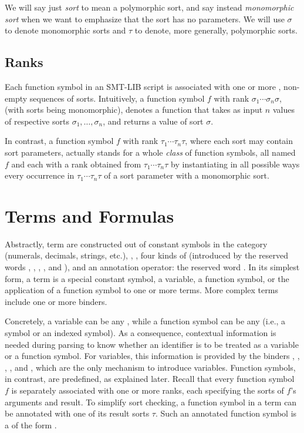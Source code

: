We will say just \emph{sort} to mean a polymorphic sort, and 
say instead \emph{monomorphic sort} when we want to emphasize 
that the sort has no parameters. 
We will use $\sigma$ to denote monomorphic sorts and 
$\tau$ to denote, more generally, polymorphic sorts.


\subsection{Ranks}

Each function symbol in an SMT-LIB script is associated with one or more 
, non-empty sequences of sorts.
Intuitively, a function symbol $f$ with rank $\sigma_1\cdots\sigma_n\sigma$,
(with sorts being monomorphic),
denotes a function that takes as input $n$ values of respective sorts
$\sigma_1, \ldots, \sigma_n$,
and returns a value of sort $\sigma$.

In contrast, a function symbol $f$ with rank $\tau_1\cdots\tau_n\tau$,
where each sort may contain sort parameters,
actually stands for a whole \emph{class} of function symbols, 
all named $f$ and each with a rank obtained from $\tau_1\cdots\tau_n\tau$ 
by instantiating in all possible ways every occurrence in $\tau_1\cdots\tau_n\tau$
of a sort parameter with a monomorphic sort.


\section{Terms and Formulas} \label{sec:concrete-terms}

Abstractly, term are constructed out of 
constant symbols in the  category
(numerals, decimals, strings, etc.),
, 
, 
four kinds of  
(introduced by the reserved words , , , , and ),
and an annotation operator: the reserved word \ter{!}.
In its simplest form, a term is 
a special constant symbol,
a variable,
a function symbol,
or the application of a function symbol to one or more terms.
More complex terms include one or more binders.

Concretely, a variable can be any ,
while a function symbol can be any 
(i.e., a symbol or an indexed symbol).
As a consequence, contextual information is needed during parsing
to know whether an identifier is to be treated as a variable or 
a function symbol. 
For variables, this information is provided by the binders 
, , , , and , 
which are the only mechanism to introduce variables.
Function symbols, in contrast, are predefined, as explained later.
Recall that every function symbol $f$ is separately associated 
with one or more ranks,
each specifying the sorts of $f$'s arguments and result.
To simplify sort checking,
a function symbol in a term can be annotated with one of its result sorts $\tau$.
Such an annotated function symbol is a 
of the form .
\bigskip

